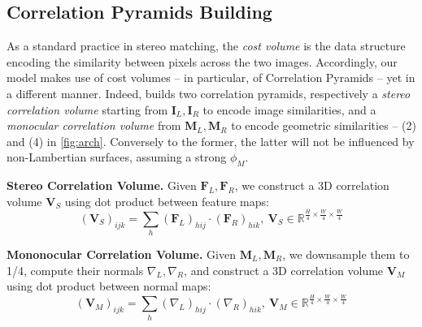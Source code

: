 \subsection{Correlation Pyramids Building}
\label{subsec:corr_pyramids}

As a standard practice in stereo matching, the \textit{cost volume} is the data structure encoding the similarity between pixels across the two images. Accordingly, our model makes use of cost volumes -- in particular, of Correlation Pyramids \cite{lipson2021raft} -- yet in a different manner.
Indeed, \method builds two correlation pyramids, respectively a \textit{stereo correlation volume} starting from $\mathbf{I}_L, \mathbf{I}_R$ to encode image similarities, and a \textit{monocular correlation volume} from $\mathbf{M}_L, \mathbf{M}_R$ to encode geometric similarities -- (2) and (4) in \cref{fig:arch}. 
Conversely to the former, the latter will not be influenced by non-Lambertian surfaces, assuming a strong $\phi_M$.

\textbf{Stereo Correlation Volume.} Given $\mathbf{F}_L, \mathbf{F}_R$, we construct a 3D correlation volume $\mathbf{V}_S$ using dot product between feature maps:
\begin{equation}
    (\mathbf{V}_S)_{ijk} = \sum_{h} (\mathbf{F}_L)_{hij} \cdot (\mathbf{F}_R)_{hik}, \ \mathbf{V}_S \in \mathbb{R}^{\frac{H}{4} \times \frac{W}{4} \times \frac{W}{4}}
    \label{eq:dot_corr}
\end{equation}

\textbf{Mononocular Correlation Volume.} Given $\mathbf{M}_L, \mathbf{M}_R$, 
we downsample them to 1/4, compute their normals $\nabla_L, \nabla_R$,
and construct a 3D correlation volume $\mathbf{V}_M$ using dot product between normal maps:
\begin{equation}
    (\mathbf{V}_M)_{ijk} = \sum_{h} (\nabla_L)_{hij} \cdot (\nabla_R)_{hik}, \ \mathbf{V}_M \in \mathbb{R}^{\frac{H}{4} \times \frac{W}{4} \times \frac{W}{4}}
    \label{eq:dot_corr_mono}
\end{equation}

